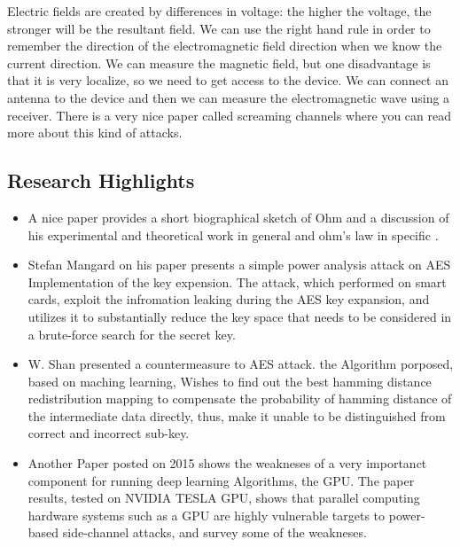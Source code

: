 Electric fields are created by differences in voltage: the higher the voltage,
the stronger will be the resultant field. We can use the right hand rule in
order to remember the direction of the electromagnetic field direction when we
know the current direction. We can measure the magnetic field, but one
disadvantage is that it is very localize, so we need to get access to the
device. We can connect an antenna to the device and then we can measure the
electromagnetic wave using a receiver. There is a very nice paper called
screaming channels where you can read more about this kind of attacks.

\subsection { Research Highlights }

\begin{itemize}
    \item A nice paper provides a short biographical sketch of Ohm and a discussion of his experimental and theoretical work in general and ohm's law in specific \cite{gupta1980georg}.
    \item Stefan Mangard on his paper \cite{mangard2002simple} presents a simple power analysis attack on AES Implementation of the key expension.
    The attack, which performed on smart cards, exploit the infromation leaking during the AES key expansion, 
    and utilizes it to substantially reduce the key space that needs to be considered in a brute-force search for the secret key.
    \item W. Shan \cite{shan2017machine} presented a countermeasure to AES attack. the Algorithm porposed, based
    on maching learning, Wishes to find out the best hamming distance redistribution mapping to compensate the probability of hamming distance of the intermediate data directly,
    thus, make it unable to be distinguished from correct and incorrect sub-key.
    \item Another Paper posted on 2015 \cite{luo2015side} shows the weakneses of a very importanct component for running deep learning Algorithms, the GPU.
    The paper results, tested on NVIDIA TESLA GPU, shows that parallel computing hardware systems such as a GPU are highly vulnerable targets to power-based side-channel attacks,
    and survey some of the weakneses.
\end{itemize}


   
